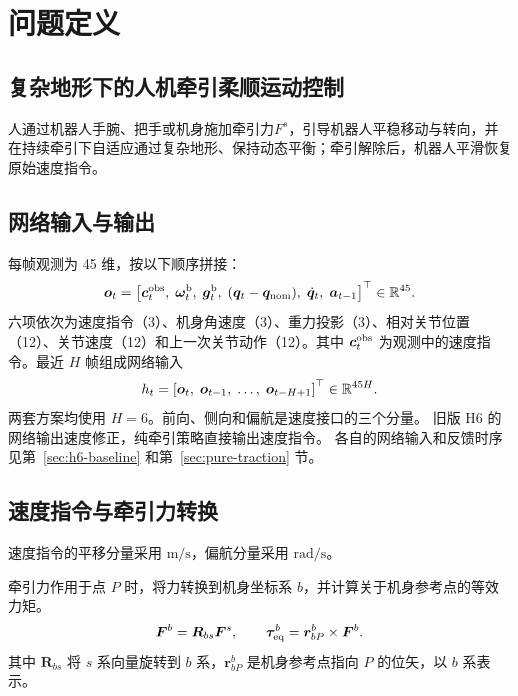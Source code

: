 \section{问题定义}
\subsection{复杂地形下的人机牵引柔顺运动控制}

人通过机器人手腕、把手或机身施加牵引力$F^s$，引导机器人平稳移动与转向，并在持续牵引下自适应通过复杂地形、保持动态平衡；牵引解除后，机器人平滑恢复原始速度指令。

\subsection{网络输入与输出}
每帧观测为 45 维，按以下顺序拼接：
\begin{equation}
\bm o_t=\left[
\bm c_t^{\rm obs},\;
\bm\omega_t^{\rm b},\;
\bm g_t^{\rm b},\;
(\bm q_t-\bm q_{\rm nom}),\;
\dot{\bm q}_t,\;
\bm a_{t-1}
\right]^\top\in\mathbb{R}^{45}.
\label{eq:proprio-observation}
\end{equation}
六项依次为速度指令（3）、机身角速度（3）、重力投影（3）、相对关节位置（12）、关节速度（12）和上一次关节动作（12）。其中 $\bm c_t^{\rm obs}$ 为观测中的速度指令。最近 $H$ 帧组成网络输入
\begin{equation}
h_t=\left[\bm o_t,\;\bm o_{t-1},\;\ldots,\;\bm o_{t-H+1}\right]^\top\in\mathbb{R}^{45H}.
\label{eq:proprio-history}
\end{equation}
两套方案均使用 $H=6$。前向、侧向和偏航是速度接口的三个分量。
旧版 H6 的网络输出速度修正，纯牵引策略直接输出速度指令。
各自的网络输入和反馈时序见第~\ref{sec:h6-baseline} 和第~\ref{sec:pure-traction} 节。

\subsection{速度指令与牵引力转换}

速度指令的平移分量采用 $\mathrm{m/s}$，偏航分量采用 $\mathrm{rad/s}$。

牵引力作用于点 $P$ 时，将力转换到机身坐标系 $b$，并计算关于机身参考点的等效力矩。
\begin{equation}
\bm F^b=\bm R_{bs}\bm F^s,
\qquad \bm\tau_{\rm eq}^b=\bm r_{bP}^b\times\bm F^b.
\label{eq:force-transform}
\end{equation}
其中 $\bm R_{bs}$ 将 $s$ 系向量旋转到 $b$ 系，$\bm r_{bP}^b$ 是机身参考点指向 $P$ 的位矢，以 $b$ 系表示。
